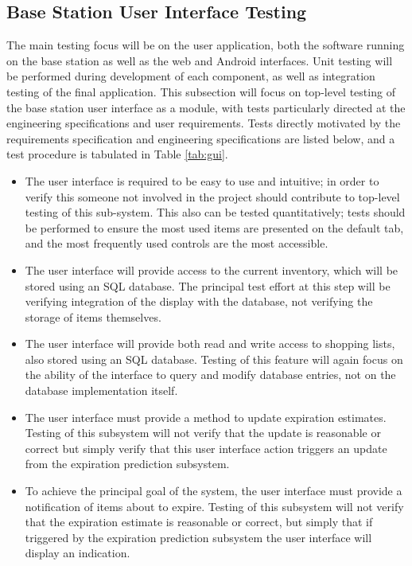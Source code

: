 \documentclass[11pt]{article} %
\begin{document}
\subsection{Base Station User Interface Testing}
The main testing focus will be on the user application, both the software running on the base station as well as the web and Android interfaces.  Unit testing will be performed during development of each component, as well as integration testing of the final application. This subsection will focus on top-level testing of the base station user interface as a module, with tests particularly directed at the engineering specifications and user requirements. Tests directly motivated by the requirements specification and engineering specifications are listed below, and a test procedure is tabulated in Table \ref{tab:gui}.
\begin{itemize}
\item The user interface is required to be easy to use and intuitive; in order to verify this someone not involved in the project should contribute to top-level testing of this sub-system. This also can be tested quantitatively; tests should be performed to ensure the most used items are presented on the default tab, and the most frequently used controls are the most accessible.
\item The user interface will provide access to the current inventory, which will be stored using an SQL database. The principal test effort at this step will be verifying integration of the display with the database, not verifying the storage of items themselves.
\item The user interface will provide both read and write access to shopping lists, also stored using an SQL database. Testing of this feature will again focus on the ability of the interface to query and modify database entries, not on the database implementation itself.
\item The user interface must provide a method to update expiration estimates. Testing of this subsystem will not verify that the update is reasonable or correct but simply verify that this user interface action triggers an update from the expiration prediction subsystem.
\item To achieve the principal goal of the system, the user interface must provide a notification of items about to expire. Testing of this subsystem will not verify that the expiration estimate is reasonable or correct, but simply that if triggered by the expiration prediction subsystem the user interface will display an indication.
\end{itemize}
\end{document}

